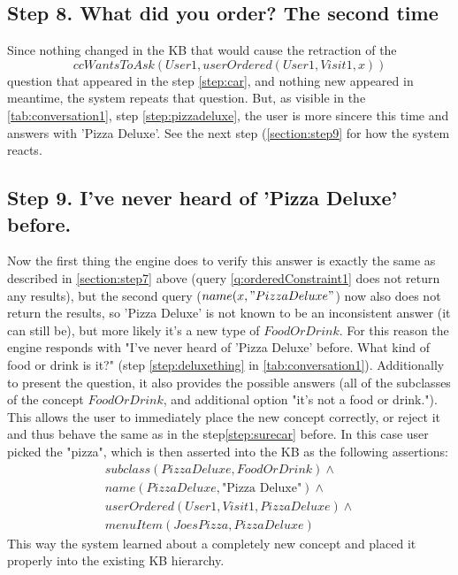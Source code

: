 \subsection{Step 8. What did you order? The second time}
\label{section:step8}
Since nothing changed in the KB that would cause the retraction of the 
\begin{equation*}
ccWantsToAsk(User1,userOrdered(User1,Visit1,x))
\end{equation*}
question that appeared in the
step \ref{step:car}, and nothing new appeared in meantime, the system repeats
that question. But, as visible in the \autoref{tab:conversation1}, step 
\ref{step:pizzadeluxe}, the user is more sincere this time and answers with
'Pizza Deluxe'. See the next step (\autoref{section:step9} for how the system 
reacts.

\subsection{Step 9. I've never heard of 'Pizza Deluxe' before.}
\label{section:step9}
Now the first thing the engine does to verify this answer is exactly the same 
as described in \autoref{section:step7} above 
(query \ref{q:orderedConstraint1} does not return any results), but the second
query ($name(x,"Pizza Deluxe"$) now also does not return the results, so 
'Pizza Deluxe' is not known to be an inconsistent answer (it can still be), but
more likely it's a new type of $FoodOrDrink$. For this reason the engine
responds with "I've never heard of 'Pizza Deluxe' before. What kind of
food or drink is it?" (step \ref{step:deluxething} in 
\autoref{tab:conversation1}). Additionally to present the question, it also
provides the possible answers (all of the subclasses of the concept 
$FoodOrDrink$, and additional option "it's not a food or drink."). This allows
the user to immediately place the new concept correctly, or reject it and 
thus behave the same as in the step\ref{step:surecar} before. In this case
user picked the "pizza", which is then asserted into the KB as the 
following assertions:
\begin{equation}
\begin{gathered}
subclass(PizzaDeluxe,FoodOrDrink) \land \\
name(PizzaDeluxe, \text{"Pizza Deluxe"}) \land \\
userOrdered(User1,Visit1,PizzaDeluxe) \land \\
menuItem(JoesPizza,PizzaDeluxe)
\end{gathered}
\end{equation}
This way the system learned about a completely new concept and placed it properly
into the existing KB hierarchy.

